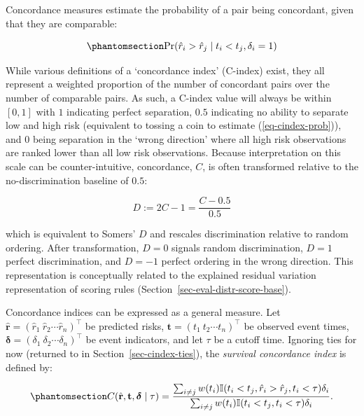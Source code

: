 \documentclass[
  letterpaper,
  krantz2]{style/krantz}
\begin{document}
Concordance measures estimate the probability of a pair being
concordant, given that they are comparable:

\begin{equation}\phantomsection\label{eq-cindex-prob}{
\Pr(\hat{r}_i > \hat{r}_j  \mid  t_i < t_j, \delta_i = 1)
}\end{equation}

While various definitions of a `concordance index' (C-index) exist, they
all represent a weighted proportion of the number of concordant pairs
over the number of comparable pairs. As such, a C-index value will
always be within \([0, 1]\) with \(1\) indicating perfect separation,
\(0.5\) indicating no ability to separate low and high risk (equivalent
to tossing a coin to estimate (\ref{eq-cindex-prob})), and \(0\) being
separation in the `wrong direction' where all high risk observations are
ranked lower than all low risk observations. Because interpretation on
this scale can be counter-intuitive, concordance, \(C\), is often
transformed relative to the no-discrimination baseline of \(0.5\):

\[
D := 2C - 1 = \frac{C - 0.5}{0.5}
\]

which is equivalent to Somers' \(D\) and rescales
discrimination relative to random ordering. After transformation,
\(D=0\) signals random discrimination, \(D=1\) perfect discrimination,
and \(D=-1\) perfect ordering in the wrong direction. This
representation is conceptually related to the explained residual
variation  representation of scoring
rules (Section~\ref{sec-eval-distr-score-base}).

Concordance indices can be expressed as a general measure. Let
\(\boldsymbol{\mathbf{\hat{r}}} = ({\hat{r}}_1 \ {\hat{r}}_2 \cdots {\hat{r}}_{n})^\top\)
be predicted risks,
\(\boldsymbol{\mathbf{t}} = ({t}_1 \ {t}_2 \cdots {t}_{n})^\top\) be
observed event times,
\(\boldsymbol{\mathbf{\delta}} = ({\delta}_1 \ {\delta}_2 \cdots {\delta}_{n})^\top\)
be event indicators, and let \(\tau\) be a cutoff time. Ignoring ties
for now (returned to in Section~\ref{sec-cindex-ties}), the
\emph{survival concordance index} is defined
by:

\begin{equation}\phantomsection\label{eq-cindex}{
C(\hat{\mathbf{r}}, \mathbf{t}, \boldsymbol{\delta}\mid \tau) = \frac{\sum_{i\neq j} w(t_i)\mathbb{I}(t_i < t_j, \hat{r}_i > \hat{r}_j, t_i < \tau)\delta_i}{\sum_{i\neq j}w(t_i)\mathbb{I}(t_i < t_j, t_i < \tau)\delta_i}.
}\end{equation}
\end{document}
